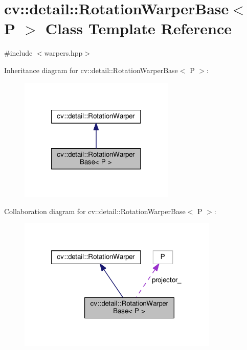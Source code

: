 \hypertarget{classcv_1_1detail_1_1RotationWarperBase}{\section{cv\-:\-:detail\-:\-:Rotation\-Warper\-Base$<$ P $>$ Class Template Reference}
\label{classcv_1_1detail_1_1RotationWarperBase}
}


{\ttfamily \#include $<$warpers.\-hpp$>$}



Inheritance diagram for cv\-:\-:detail\-:\-:Rotation\-Warper\-Base$<$ P $>$\-:\nopagebreak
\begin{figure}[H]
\begin{center}
\leavevmode
\includegraphics[width=210pt]{classcv_1_1detail_1_1RotationWarperBase__inherit__graph}
\end{center}
\end{figure}


Collaboration diagram for cv\-:\-:detail\-:\-:Rotation\-Warper\-Base$<$ P $>$\-:\nopagebreak
\begin{figure}[H]
\begin{center}
\leavevmode
\includegraphics[width=270pt]{classcv_1_1detail_1_1RotationWarperBase__coll__graph}
\end{center}
\end{figure}
